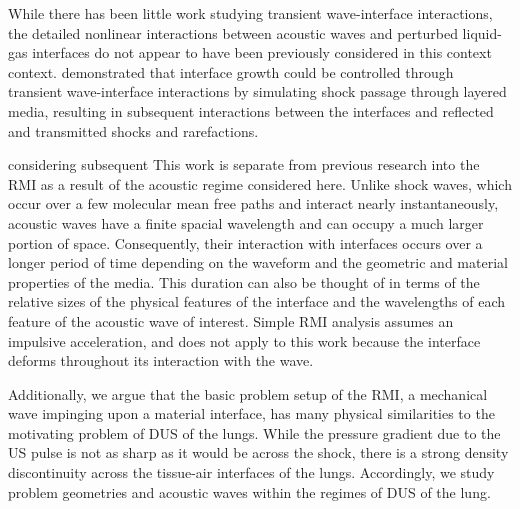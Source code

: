 While there has been little work studying transient wave-interface
interactions, the detailed nonlinear interactions between acoustic
waves and perturbed liquid-gas interfaces do not appear to have been
previously considered in this context
context. \cite{HenrydeFrahan2015b} demonstrated that interface growth
could be controlled through transient wave-interface interactions by
simulating shock passage through layered media, resulting in
subsequent interactions between the interfaces and reflected and
transmitted shocks and rarefactions.

considering subsequent This work is separate
from previous research into the \ac{RMI} as a result of the acoustic
regime considered here. Unlike shock waves, which occur over a few
molecular mean free paths and interact nearly instantaneously,
acoustic waves have a finite spacial wavelength and can occupy a much
larger portion of space. Consequently, their interaction with
interfaces occurs over a longer period of time depending on the
waveform and the geometric and material properties of the media. This
duration can also be thought of in terms of the relative sizes of the
physical features of the interface and the wavelengths of each feature
of the acoustic wave of interest. Simple \ac{RMI} analysis assumes an
impulsive acceleration, and does not apply to this work because the
interface deforms throughout its interaction with the wave.

Additionally, we argue that the basic problem setup of the \ac{RMI}, a
mechanical wave impinging upon a material interface, has many
physical similarities to the motivating problem of \ac{DUS} of the
lungs. While the pressure gradient due to the \ac{US} pulse is not as
sharp as it would be across the shock, there is a strong density
discontinuity across the tissue-air interfaces of the
lungs. Accordingly, we study problem geometries and acoustic waves
within the regimes of \ac{DUS} of the lung.

